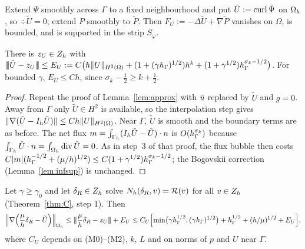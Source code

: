 Extend $\Psi$ smoothly across $\Gamma$ to a fixed neighbourhood and put $\tilde U:=\operatorname{curl}\tilde\Psi$ on $\Omega_h$, so $\div\tilde U=0$;
extend $P$ smoothly to $\tilde P$. Then $F_U:=-\Delta\tilde U+\nabla\tilde P$ vanishes on $\Omega$, is bounded, and is supported in
the strip $S_\varphi$.

\begin{lemma}\label{hc:approx}
There is $z_U\in Z_h$ with $|\!|\!|\tilde U-z_U|\!|\!|\le E_U:=C\bigl(h\lVert U\rVert_{H^2(\Omega)}+(1+(\gamma h_\Gamma)^{1/2})h^k+(1+\gamma^{1/2})h_\Gamma^{\sigma_k-1/2}\bigr)$. For bounded $\gamma$, $E_U\le Ch$, since $\sigma_k-\frac12\ge k+\frac12$.
\end{lemma}

\begin{proof}
Repeat the proof of Lemma~\ref{lem:approx} with $\tilde u$ replaced by $\tilde U$ and $g=0$. Away from $\Gamma$ only $\tilde U\in
H^2$ is available, so the interpolation step gives $\lVert \nabla(\tilde U-I_h\tilde U)\rVert\le Ch\lVert U\rVert_{H^2(\Omega)}$. Near $\Gamma$, $\tilde U$
is smooth and the boundary terms are as before. The net flux $m=\int_{\Gamma_h}(I_h\tilde U-\tilde U)\cdot n$ is $O(h_\Gamma^{\sigma_k})$
because $\int_{\Gamma_h}\tilde U\cdot n=\int_{\Omega_h}\operatorname{div}\tilde U=0$. As in step~3 of that proof, the flux bubble then costs
$C|m|(h_\Gamma^{-1/2}+(\mu/h)^{1/2})\le C(1+\gamma^{1/2})h_\Gamma^{\sigma_k-1/2}$; the Bogovskii correction (Lemma~\ref{lem:infsup})
is unchanged.
\end{proof}

\begin{theorem}\label{hc:thm}
Let $\gamma\ge\gamma_0$ and let $\delta_R\in Z_h$ solve $N_h(\delta_R,v)=\mathcal R(v)$ for all $v\in Z_h$ (Theorem~\ref{thm:C}, step 1).
Then
\[
\Bigl\|\nabla\Bigl(\frac\mu h\delta_R-\tilde U\Bigr)\Bigr\|_{\Omega_h}
\le|\!|\!|\frac\mu h\delta_R-z_U|\!|\!|+E_U
\le C_U\Bigl[\min\bigl(\gamma h_\Gamma^{1/2},(\gamma h_\Gamma)^{1/2}\bigr)+h_\Gamma^{1/2}+(h/\mu)^{1/2}+E_U\Bigr],
\]
where $C_U$ depends on (M0)--(M2), $k$, $L$ and on norms of $p$ and $U$ near $\Gamma$.
\end{theorem}


